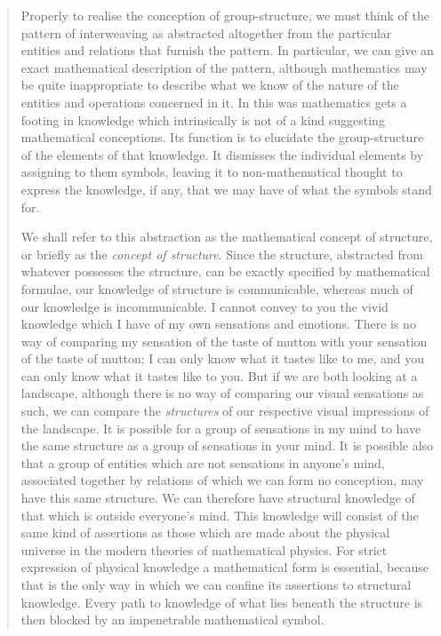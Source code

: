 \begin{quote}
    Properly to realise the conception of group-structure, we must think of the pattern of interweaving as abstracted altogether from the particular entities and relations that furnish the pattern.  In particular, we can give an exact mathematical description of the pattern, although mathematics may be quite inappropriate to describe what we know of the nature of the entities and operations concerned in it.  In this was mathematics gets a footing in knowledge which intrinsically is not of a kind suggesting mathematical conceptions.  Its function is to elucidate the group-structure of the elements of that knowledge.  It dismisses the individual elements by assigning to them symbols, leaving it to non-mathematical thought to express the knowledge, if any, that we may have of what the symbols stand for.
    
    We shall refer to this abstraction as the mathematical concept of structure, or briefly as the \emph{concept of structure}.  Since the structure, abstracted from whatever possesses the structure, can be exactly specified by mathematical formulae, our knowledge of structure is communicable, whereas much of our knowledge is incommunicable.  I cannot convey to you the vivid knowledge which I have of my own sensations and emotions.  There is no way of comparing my sensation of the taste of mutton with your sensation of the taste of mutton; I can only know what it tastes like to me, and you can only know what it tastes like to you.  But if we are both looking at a landscape, although there is no way of comparing our visual sensations as such, we can compare the \emph{structures} of our respective visual impressions of the landscape.  It is possible for a group of sensations in my mind to have the same structure as a group of sensations in your mind.  It is possible also that a group of entities which are not sensations in anyone's mind, associated together by relations of which we can form no conception, may have this same structure.  We can therefore have structural knowledge of that which is outside everyone's mind.  This knowledge will consist of the same kind of assertions as those which are made about the physical universe in the modern theories of mathematical physics.  For strict expression of physical knowledge a mathematical form is essential, because that is the only way in which we can confine its assertions to structural knowledge.  Every path to knowledge of what lies beneath the structure is then blocked by an impenetrable mathematical symbol.
    

\end{quote}
